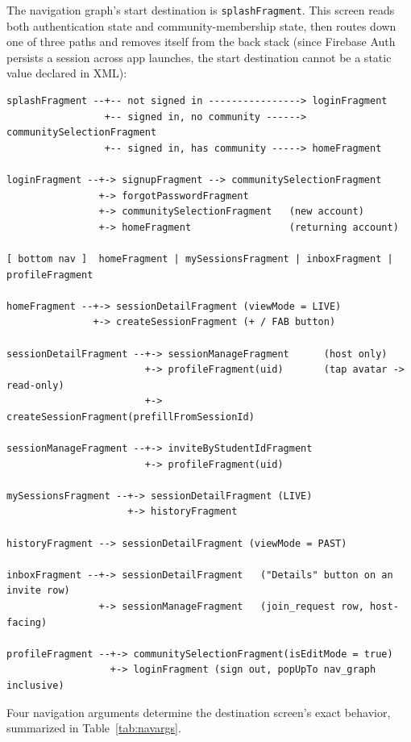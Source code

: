 The navigation graph's start destination is \texttt{splashFragment}. This screen reads both authentication state and community-membership state, then routes down one of three paths and removes itself from the back stack (since Firebase Auth persists a session across app launches, the start destination cannot be a static value declared in XML):

\begin{verbatim}
splashFragment --+-- not signed in ----------------> loginFragment
                 +-- signed in, no community ------> communitySelectionFragment
                 +-- signed in, has community -----> homeFragment

loginFragment --+-> signupFragment --> communitySelectionFragment
                +-> forgotPasswordFragment
                +-> communitySelectionFragment   (new account)
                +-> homeFragment                 (returning account)

[ bottom nav ]  homeFragment | mySessionsFragment | inboxFragment | profileFragment

homeFragment --+-> sessionDetailFragment (viewMode = LIVE)
               +-> createSessionFragment (+ / FAB button)

sessionDetailFragment --+-> sessionManageFragment      (host only)
                        +-> profileFragment(uid)       (tap avatar -> read-only)
                        +-> createSessionFragment(prefillFromSessionId)

sessionManageFragment --+-> inviteByStudentIdFragment
                        +-> profileFragment(uid)

mySessionsFragment --+-> sessionDetailFragment (LIVE)
                     +-> historyFragment

historyFragment --> sessionDetailFragment (viewMode = PAST)

inboxFragment --+-> sessionDetailFragment   ("Details" button on an invite row)
                +-> sessionManageFragment   (join_request row, host-facing)

profileFragment --+-> communitySelectionFragment(isEditMode = true)
                  +-> loginFragment (sign out, popUpTo nav_graph inclusive)
\end{verbatim}

Four navigation arguments determine the destination screen's exact behavior, summarized in Table~\ref{tab:navargs}.

